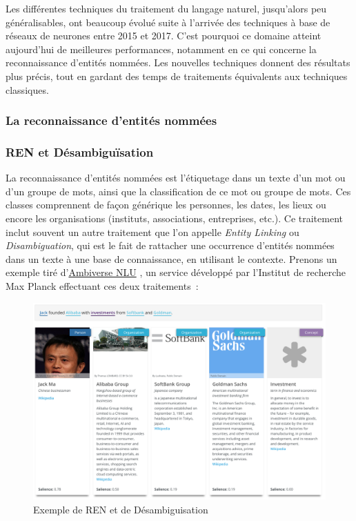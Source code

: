 Les différentes techniques du traitement du langage naturel, jusqu'alors peu généralisables, ont beaucoup évolué suite à l'arrivée des techniques à base de réseaux de neurones entre 2015 et 2017. C'est pourquoi ce domaine atteint aujourd'hui de meilleures performances, notamment en ce qui concerne la reconnaissance d'entités nommées. Les nouvelles techniques donnent des résultats plus précis, tout en gardant des temps de traitements équivalents aux techniques classiques.
\label{section 2.1.1}

\subsubsection{La reconnaissance d'entités nommées}

\subsubsection*{REN et Désambiguïsation}
La reconnaissance d'entités nommées est l'étiquetage dans un texte d'un mot ou d'un groupe de mots, ainsi que la classification de ce mot ou groupe de mots. Ces classes comprennent de façon générique les personnes, les dates, les lieux ou encore les organisations (instituts, associations, entreprises, etc.). Ce traitement inclut souvent un autre traitement que l'on appelle \textit{Entity Linking} ou \textit{Disambiguation}, qui est le fait de rattacher une occurrence d'entités nommées dans un texte à une base de connaissance, en utilisant le contexte. Prenons un exemple tiré d'\href{https://ambiversenlu.mpi-inf.mpg.de/}{Ambiverse NLU} \cite{ambiverse-nlu}, un service développé par l'Institut de recherche Max Planck effectuant ces deux traitements~:
\newline

\begin{figure}[H]
    \centering
    \includegraphics[scale=0.24]{images/ner-demo.png}
    \caption{Exemple de REN et de Désambiguisation}
    \label{fig:ner-demo}
\end{figure}

